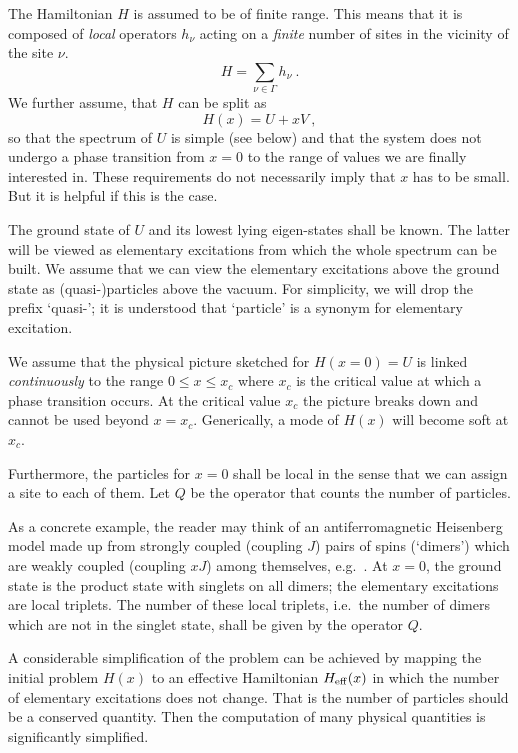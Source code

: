The Hamiltonian $H$ is assumed to be of finite range. This means
that it is composed of {\it local} operators $h_{\nu}$ acting on a 
{\it finite} number of  sites in the vicinity of the site $\nu$. 
\begin{equation}
  \label{H_local}
  H=\sum_{\nu\in\Gamma}h_{\nu}\ .
\end{equation}
We further assume, that $H$ can be split as 
\begin{equation}
  \label{H_pert}
  H(x)=U+x V\ ,
\end{equation}
so that the spectrum of $U$ is simple (see below) and that the
system does not undergo a phase transition from $x=0$ to the
range of values we are finally interested in.
These requirements do not necessarily imply that $x$ has
to be small. But it is helpful if this is the case.

The ground state of $U$ and its lowest
lying eigen-states shall be known. 
The latter will be viewed as elementary excitations
from which the whole spectrum can be built. 
We assume that we can view the elementary excitations 
above the ground state  as (quasi-)particles above the vacuum.
For simplicity, we will drop the prefix `quasi-'; it is understood
that `particle' is a synonym for elementary excitation.

We assume that the physical picture sketched for $H(x=0)=U$ is
linked {\it continuously} to the range $0\le x \le x_c$ where
$x_c$ is the critical value at which a phase transition 
occurs. At the critical value $x_c$ the picture breaks down and 
cannot be used  beyond $x=x_c$. 
Generically, a mode of $H(x)$ will become soft at  $x_c$.
 
Furthermore, the particles for $x=0$ shall be local 
 in the sense that we can assign a site to each of them.
Let $Q$ be the operator that counts the number of particles. 

As a concrete example, the reader may think of an antiferromagnetic
Heisenberg model made up from strongly coupled (coupling $J$) 
pairs of spins (`dimers') which are weakly coupled (coupling $x J$)
among themselves, e.g.~.
At $x=0$, the ground state is the product state with singlets
on all dimers; the elementary excitations are local triplets.
The number of these local triplets, i.e.\
the number of dimers which are not in the singlet state,
 shall be given by the operator $Q$.
    
A considerable simplification of the problem can be achieved by
mapping the initial problem $H(x)$ to an effective Hamiltonian
$H_{\rm eff}(x)$ in which the number of elementary excitations does not
change. That is the number of particles should be a
conserved quantity. Then the computation of many physical quantities
is significantly simplified.

